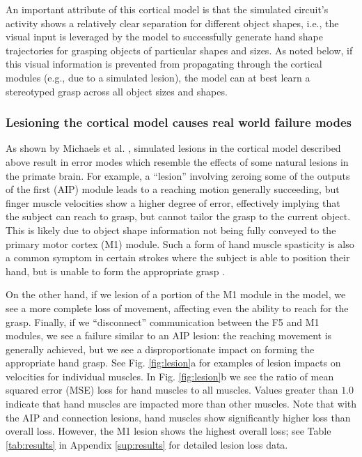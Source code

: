 \documentclass[12pt]{iopart}
\begin{document}
An important attribute of this cortical model is that  the simulated circuit's activity shows a relatively
clear separation for different object shapes, i.e., the  visual input is leveraged by the model to
successfully generate hand shape trajectories for grasping objects of particular shapes and sizes. As noted
below, if this visual information is prevented from propagating through the cortical modules (e.g., due to a
simulated lesion), the model can at best learn a stereotyped grasp across all object sizes and shapes. 

\subsubsection{Lesioning the cortical model causes real world failure modes}
As shown by Michaels et al. \cite{michaels.mrnn}, simulated lesions in the cortical model described
above result in error modes which resemble the effects of some natural lesions in the primate brain.
For example, a ``lesion'' involving zeroing some of the outputs of the first (AIP) module 
leads to a reaching motion generally succeeding, but finger muscle velocities show a higher
degree of error, effectively implying that the subject can reach to grasp, but cannot
tailor the grasp to the current object. This is likely due to object shape information not
being fully conveyed to the primary motor cortex (M1) module. Such a form of hand muscle spasticity
is also a common symptom in certain strokes where the subject is able to position their
hand, but is unable to form the appropriate grasp \cite{khanna.openloop, puthenveettil.hand}. 

On the other hand, if we lesion of a portion of the M1 module in the model,
we see a more complete loss of movement, affecting even the ability to reach for the grasp.
Finally, if we ``disconnect'' communication between the F5 and M1 modules,
we see a failure similar to an AIP lesion: the reaching movement is generally achieved, but
we see a disproportionate impact on forming the appropriate hand grasp. See Fig.
\ref{fig:lesion}a for examples of lesion impacts on velocities for individual muscles.
In Fig. \ref{fig:lesion}b we see the ratio of mean squared error (MSE) loss for hand
muscles to all muscles. Values greater than $1.0$ indicate that hand muscles are impacted more
than other muscles. Note that with the AIP and connection lesions, hand muscles show significantly
higher loss than overall loss. However, the M1 lesion shows the highest overall loss; see Table
\ref{tab:results} in Appendix \ref{sup:results} for detailed lesion loss data.
\end{document}
